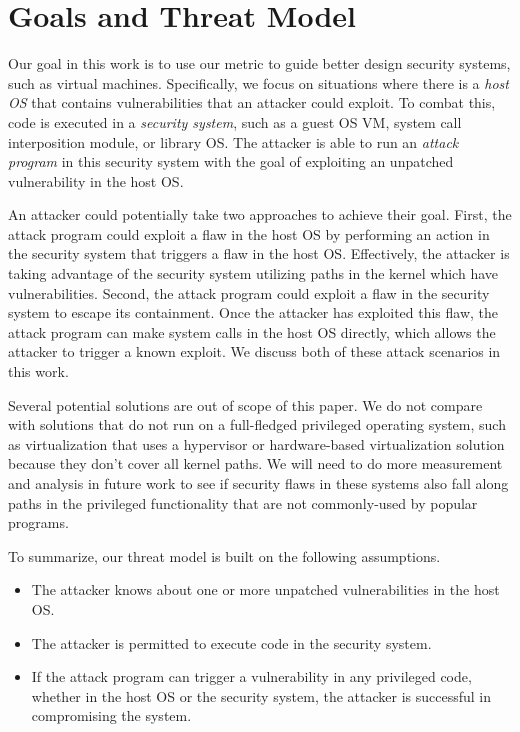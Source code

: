 \section{Goals and Threat Model}
\label{sec.motivation-and-background}

Our goal in this work is to use our metric to guide better design
security systems, such as virtual machines. Specifically, we focus on 
situations where there is a \emph{host OS} that contains vulnerabilities
that an attacker could exploit. To combat this, code is executed in a \emph{security system}, such as a guest OS VM, system call interposition module, or library OS. The attacker is able to run an \emph{attack program} in this security system with the goal of exploiting an unpatched vulnerability in the host OS.

An attacker could potentially take two approaches to achieve their
goal. First, the attack program could exploit a flaw in the host OS by 
performing an action in the security system that triggers a flaw in
the host OS. Effectively, the attacker is taking advantage of the security 
system utilizing paths in the kernel which have vulnerabilities.
Second, the attack program could exploit a flaw in the security system to 
escape its containment. Once the attacker has exploited this flaw, the
attack program can make system calls in the host OS directly, which allows
the attacker to trigger a known exploit. We discuss both of these attack 
scenarios in this work.


Several potential solutions are out of scope of this
paper. We do not compare with solutions that do not run on a full-fledged 
privileged operating system, such as virtualization that uses a 
hypervisor\cite{Xen-03} or hardware-based virtualization 
solution\cite{IntelVT} because they don't cover all kernel paths. %
We will need to do more measurement and analysis
in future work to see if security flaws in these systems also fall along
paths in the privileged functionality that are not commonly-used by popular
programs.

To summarize, our threat model is built on the following assumptions.

\begin{itemize}\setlength\itemsep{0em}
\item The attacker knows about one or more unpatched vulnerabilities in the 
host OS.

\item The attacker is permitted to execute code in the security
system.

\item If the attack program can trigger a vulnerability in any privileged code,
whether in the host OS or the security system, the attacker is successful in 
compromising the system.

\end{itemize}

